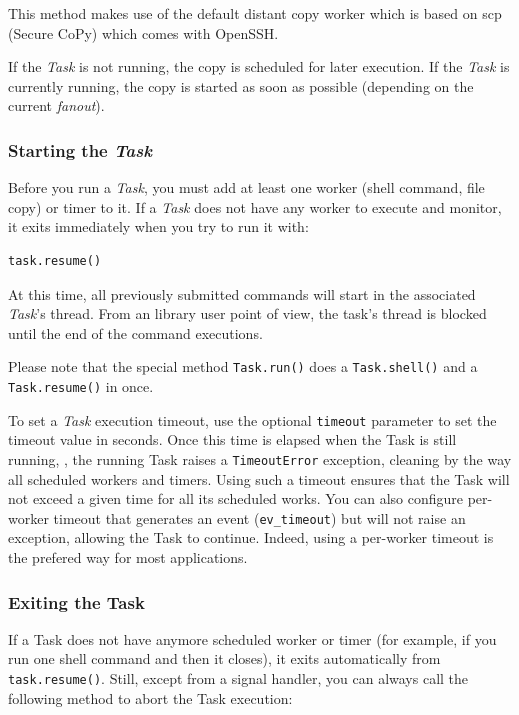 \documentclass[english,a4paper]{csuserguide}
\newcommand{\Task}{\textit{Task}\xspace}
\begin{document}
This method makes use of the default distant copy worker which is based on scp (Secure CoPy) which comes with OpenSSH.

If the \Task is not running, the copy is scheduled for later execution. If the \Task is currently running, the copy is started as soon as possible (depending on the current \emph{fanout}).

\subsubsection{Starting the \Task}

Before you run a \Task, you must add at least one worker (shell command, file copy) or timer to it. If a \Task does not have any worker to execute and monitor, it exits immediately when you try to run it with:

\begin{lstlisting}[breaklines=true, breakatwhitespace=true]
task.resume()
\end{lstlisting}

At this time, all previously submitted commands will start in the associated \Task's thread. From an library user point of view, the task's thread is blocked until the end of the command executions.

Please note that the special method \lstinline+Task.run()+ does a \lstinline+Task.shell()+ and a \lstinline+Task.resume()+ in once.

To set a \Task execution timeout, use the optional \lstinline+timeout+ parameter to set the timeout value in seconds. Once this time is elapsed when the Task is still running, , the running Task raises  a \lstinline+TimeoutError+ exception, cleaning by the way all scheduled workers and timers. Using such a timeout ensures that the Task will not exceed a given time for all its scheduled works. You can also configure per-worker timeout that generates an event (\lstinline+ev_timeout+) but will not raise an exception, allowing the Task to continue. Indeed, using a per-worker timeout is the prefered way for most applications.

\subsubsection{Exiting the Task}

If a Task does not have anymore scheduled worker or timer (for example, if you run one shell command and then it closes), it exits automatically from \lstinline+task.resume()+. Still, except from a signal handler, you can always call the following method to abort the Task execution:
\end{document}
